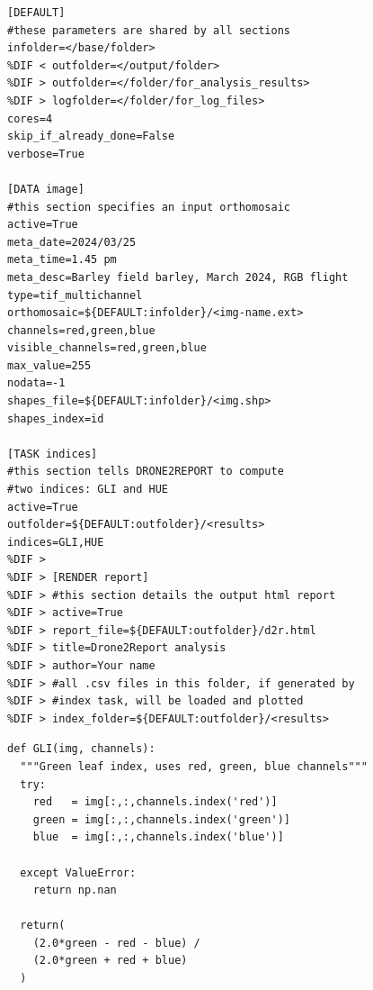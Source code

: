 \documentclass[drones,technicalnote,accept,pdftex,moreauthors]{Definitions/mdpi}
\providecommand{\DIFmodbegin}{} %
\providecommand{\DIFmodend}{} %
\begin{document}
\begin{minipage}{\hsize}%
\lstset{frame=single,framexleftmargin=-1pt,framexrightmargin=-17pt,framesep=12pt,linewidth=0.98\textwidth,language=bash}%
\DIFmodbegin
\begin{lstlisting}[caption={Example of configuration file to run \textsc{drone2report}.
This takes the form of a standard .ini file, divided in sections (between
square brackets) and supporting comments (using the hash symbol}, label={lst:config},alsolanguage=DIFcode]
[DEFAULT]
#these parameters are shared by all sections
infolder=</base/folder>
%DIF < outfolder=</output/folder>
%DIF > outfolder=</folder/for_analysis_results>
%DIF > logfolder=</folder/for_log_files>
cores=4
skip_if_already_done=False
verbose=True

[DATA image]
#this section specifies an input orthomosaic
active=True
meta_date=2024/03/25
meta_time=1.45 pm
meta_desc=Barley field barley, March 2024, RGB flight
type=tif_multichannel
orthomosaic=${DEFAULT:infolder}/<img-name.ext>
channels=red,green,blue
visible_channels=red,green,blue
max_value=255 
nodata=-1
shapes_file=${DEFAULT:infolder}/<img.shp>
shapes_index=id

[TASK indices]
#this section tells DRONE2REPORT to compute 
#two indices: GLI and HUE
active=True
outfolder=${DEFAULT:outfolder}/<results>
indices=GLI,HUE
%DIF > 
%DIF > [RENDER report]
%DIF > #this section details the output html report
%DIF > active=True
%DIF > report_file=${DEFAULT:outfolder}/d2r.html
%DIF > title=Drone2Report analysis
%DIF > author=Your name
%DIF > #all .csv files in this folder, if generated by
%DIF > #index task, will be loaded and plotted
%DIF > index_folder=${DEFAULT:outfolder}/<results>
\end{lstlisting}
\DIFmodend
\end{minipage}

\begin{minipage}{\hsize}%
\lstset{frame=single,framexleftmargin=-1pt,framexrightmargin=-17pt,framesep=12pt,linewidth=0.98\textwidth,language=python}%

\begin{lstlisting}[caption={Example of function computing the GLI vegetation index on a passed image},label={lst:GLI_function}]
def GLI(img, channels):
  """Green leaf index, uses red, green, blue channels"""
  try:
    red   = img[:,:,channels.index('red')]
    green = img[:,:,channels.index('green')]
    blue  = img[:,:,channels.index('blue')]
   
  except ValueError:
    return np.nan
    
  return(
    (2.0*green - red - blue) / 
    (2.0*green + red + blue)
  ) 
\end{lstlisting}
\end{minipage}
\end{document}
